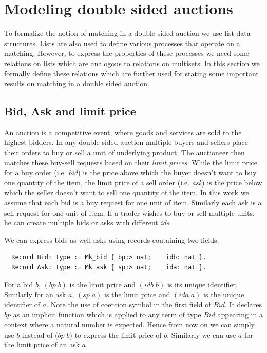\documentclass[a4paper,UKenglish,cleveref, autoref]{lipics-v2019}
\begin{document}
\section{Modeling double sided auctions}\label{sec:modeling}
To formalize the notion of matching in a double sided auction we use  list data structures.  Lists are also used to define various processes that operate on  a matching. However, to express the properties of these processes we need some  relations on lists which are analogous to  relations on multisets. In this section we formally define these relations which are further used for stating some important results on matching in a double sided auction.

\subsection{Bid, Ask and limit price}
An auction is a  competitive event, where goods and services are sold to the highest bidders. In  any double sided auction multiple buyers and sellers place their orders to buy or sell a unit of underlying product. The  auctioneer then matches these buy-sell requests  based on their \emph{limit prices}. While the limit price for a buy order (i.e. \emph{bid}) is the price above which the buyer doesn't want to buy one quantity of the item, the limit price of a sell order (i.e. \emph{ask}) is the price below which the seller doesn't want to sell one quantity of the item.  In this work we assume that each bid is a buy request for one unit of item. Similarly each ask is a sell request for one unit of item. If a trader wishes to buy or sell multiple units, he can create multiple bids or asks with different \emph{ids}. 

We can express bids as well asks using  records containing two fields. 
\begin{verbatim}
  Record Bid: Type := Mk_bid { bp:> nat;    idb: nat }.
  Record Ask: Type := Mk_ask { sp:> nat;    ida: nat }.
\end{verbatim}
For a bid $b$, $(bp \; b)$  is the limit price and $(idb \; b)$ is its unique identifier. Similarly for an ask $a$, $(sp \; a)$ is the limit price and $(ida \; a)$ is the unique identifier of $a$. Note the use of coercion symbol \tw{ :>} in the first field of $Bid$. It declares $bp$ as an implicit function which is applied  to any term of type $Bid$ appearing in a context where a natural number is expected. Hence from now on we can simply use $b$ instead of  ($bp \;b$) to express the limit price of $b$. Similarly we can use $a$ for the limit price of an ask $a$.
\end{document}
